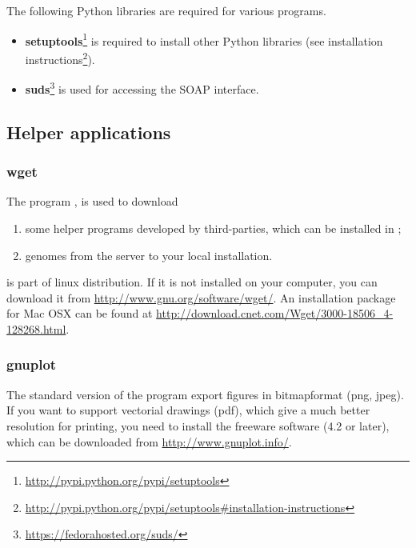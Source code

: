 \documentclass[12pt,a4paper, oneside]{scrreprt} %
\begin{document}
The following Python libraries are required for various programs.

\begin{itemize}
\item
  \textbf{setuptools}\footnote{\url{http://pypi.python.org/pypi/setuptools}}
  is required to install other Python libraries (see installation
  instructions\footnote{\url{http://pypi.python.org/pypi/setuptools\#installation-instructions}}).

\item \textbf{suds}\footnote{\url{https://fedorahosted.org/suds/}} is
  used for accessing the SOAP interface.

\end{itemize}


\subsection{Helper applications}



\subsubsection{wget}

The program , is used  to download
\begin{enumerate}

\item some helper programs developed by third-parties, which can be
  installed in \RSAT;

\item genomes from the \RSAT server to your local \RSAT installation.

\end{enumerate}

 is part of linux distribution. If it is not installed
on your computer, you can download it from
\url{http://www.gnu.org/software/wget/}.  An installation package for
Mac OSX can be found at
\url{http://download.cnet.com/Wget/3000-18506_4-128268.html}.


\subsubsection{gnuplot}

The standard version of the \RSAT program  export
figures in bitmapformat (png, jpeg). If you want to support vectorial
drawings (pdf), which give a much better resolution for printing, you
need to install the freeware software  (4.2 or
later), which can be downloaded from \url{http://www.gnuplot.info/}.
\end{document}
